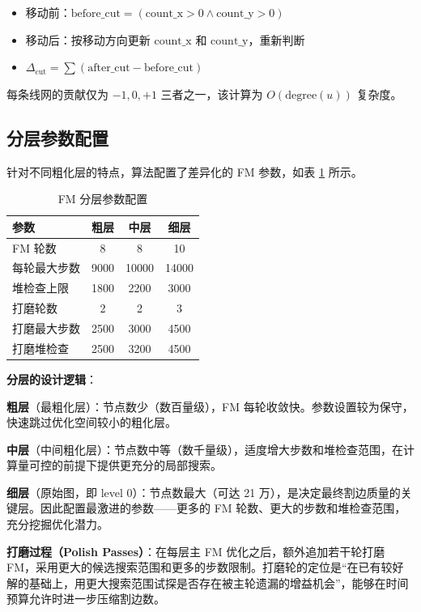 \documentclass[journal, twocolumn]{IEEEtran}
\begin{document}
\begin{itemize}
    \item 移动前：$\text{before\_cut} = (\text{count\_x} > 0 \land \text{count\_y} > 0)$
    \item 移动后：按移动方向更新 $\text{count\_x}$ 和 $\text{count\_y}$，重新判断
    \item $\Delta_{\text{cut}} = \sum (\text{after\_cut} - \text{before\_cut})$
\end{itemize}

每条线网的贡献仅为 $-1, 0, +1$ 三者之一，该计算为 $O(\text{degree}(u))$ 复杂度。

\subsection{分层参数配置}

针对不同粗化层的特点，算法配置了差异化的 FM 参数，如表 \ref{tab:fmlayers} 所示。

\begin{table}[htbp]
\centering
\caption{FM 分层参数配置}
\label{tab:fmlayers}
\footnotesize
\begin{tabular}{lccc}
\toprule
\textbf{参数} & \textbf{粗层} & \textbf{中层} & \textbf{细层} \\
\midrule
FM 轮数 & 8 & 8 & 10 \\
每轮最大步数 & 9000 & 10000 & 14000 \\
堆检查上限 & 1800 & 2200 & 3000 \\
打磨轮数 & 2 & 2 & 3 \\
打磨最大步数 & 2500 & 3000 & 4500 \\
打磨堆检查 & 2500 & 3200 & 4500 \\
\bottomrule
\end{tabular}
\end{table}

\textbf{分层的设计逻辑}：

\textbf{粗层}（最粗化层）：节点数少（数百量级），FM 每轮收敛快。参数设置较为保守，快速跳过优化空间较小的粗化层。

\textbf{中层}（中间粗化层）：节点数中等（数千量级），适度增大步数和堆检查范围，在计算量可控的前提下提供更充分的局部搜索。

\textbf{细层}（原始图，即 level 0）：节点数最大（可达 21 万），是决定最终割边质量的关键层。因此配置最激进的参数——更多的 FM 轮数、更大的步数和堆检查范围，充分挖掘优化潜力。

\textbf{打磨过程（Polish Passes）}：在每层主 FM 优化之后，额外追加若干轮打磨 FM，采用更大的候选搜索范围和更多的步数限制。打磨轮的定位是“在已有较好解的基础上，用更大搜索范围试探是否存在被主轮遗漏的增益机会”，能够在时间预算允许时进一步压缩割边数。
\end{document}
